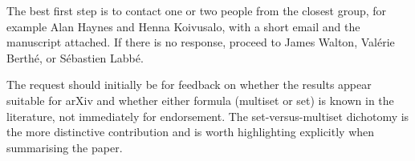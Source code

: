 \documentclass[11pt]{article}
\begin{document}
The best first step is to contact one or two people from the closest group,
for example Alan Haynes and Henna Koivusalo, with a short email and the
manuscript attached.  If there is no response, proceed to James Walton,
Val\'{e}rie Berth\'{e}, or S\'{e}bastien Labb\'{e}.

The request should initially be for feedback on whether the results appear
suitable for arXiv and whether either formula (multiset or set) is known
in the literature, not immediately for endorsement.  The set-versus-multiset
dichotomy is the more distinctive contribution and is worth highlighting
explicitly when summarising the paper.
\end{document}
